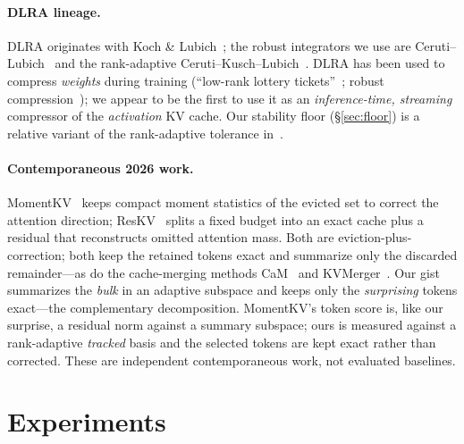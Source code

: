 \documentclass[11pt]{article}
\begin{document}
\paragraph{DLRA lineage.} DLRA originates with Koch \&
Lubich~\citep{koch2007dlra}; the robust integrators we use are
Ceruti--Lubich~\citep{ceruti2022unconventional} and the rank-adaptive
Ceruti--Kusch--Lubich~\citep{ceruti2022rankadaptive}. DLRA has been used to
compress \emph{weights} during training (``low-rank lottery
tickets''~\citep{schotthofer2022lottery};
robust compression~\citep{schotthofer2025robust}); we appear to be the first to
use it as an \emph{inference-time, streaming} compressor of the \emph{activation}
KV cache. Our stability floor (\S\ref{sec:floor}) is a relative variant of the
rank-adaptive tolerance in~\citep{ceruti2022rankadaptive}.

\paragraph{Contemporaneous 2026 work.} MomentKV~\citep{momentkv2026} keeps compact
moment statistics of the evicted set to correct the attention direction;
ResKV~\citep{reskv2026} splits a fixed budget into an exact cache plus a residual
that reconstructs omitted attention mass. Both are eviction-plus-correction; both
keep the retained tokens exact and summarize only the discarded remainder---as do
the cache-merging methods CaM~\citep{zhang2024cam} and
KVMerger~\citep{wang2024kvmerger}. Our gist summarizes the \emph{bulk} in an
adaptive subspace and keeps only the \emph{surprising} tokens exact---the
complementary decomposition. MomentKV's token score is, like our surprise, a
residual norm against a summary subspace; ours is measured against a rank-adaptive
\emph{tracked} basis and the selected tokens are kept exact rather than corrected.
These are independent contemporaneous work, not evaluated baselines.

\section{Experiments}
\label{sec:exp}
\end{document}
